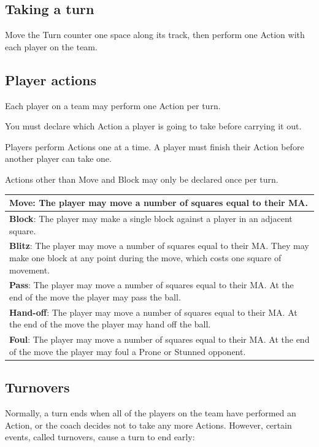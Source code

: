 \documentclass{article}
\begin{document}
\begin{multicols}{2}
\subsection{Taking a turn}
\par Move the Turn counter one space along its track, then perform one Action with each player on the team.

\subsection{Player actions}
\par Each player on a team may perform one Action per turn.
\par You must declare which Action a player is going to take before carrying it out.
\par Players perform Actions one at a time. A player must finish their Action before another player can take one.
\par Actions other than Move and Block may only be declared once per turn.

\medskip
\begin{tabularx}{\linewidth}{ | X | }
\hline
\textbf{Move}: The player may move a number of squares equal to their MA. \\
\hline
\textbf{Block}: The player may make a single block against a player in an adjacent square. \\
\hline
\textbf{Blitz}: The player may move a number of squares equal to their MA. They may make one block at any point during the move, which costs one square of movement. \\
\hline
\textbf{Pass}: The player may move a number of squares equal to their MA. At the end of the move the player may pass the ball. \\
\hline
\textbf{Hand-off}: The player may move a number of squares equal to their MA. At the end of the move the player may hand off the ball. \\
\hline
\textbf{Foul}: The player may move a number of squares equal to their MA. At the end of the move the player may foul a Prone or Stunned opponent. \\
\hline
\end{tabularx}
\medskip

\subsection{Turnovers}
\par Normally, a turn ends when all of the players on the team have performed an Action, or the coach decides not to take any more Actions. However, certain events, called turnovers, cause a turn to end early:


\end{multicols}
\end{document}
